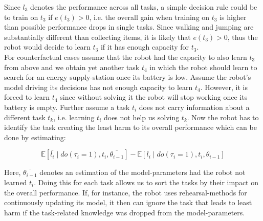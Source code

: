 \documentclass[10pt]{article}
\begin{document}
Since $l_{3}$ denotes the performance across all tasks, a simple decision rule could be to train on $t_{3}$ if $e\left(t_{3}\right)>0$, i.e. the overall gain when training on $t_{3}$ is higher than possible performance drops in single tasks. Since walking and jumping are substantially different than collecting items, it is likely that $e\left(t_{3}\right)>0$, thus the robot would decide to learn $t_{3}$ if it has enough capacity for $t_{3}$.\\
For counterfactual cases assume that the robot had the capacity to also learn $t_{3}$ from above and we obtain yet another task $t_{4}$ in which the robot should learn to search for an energy supply-station once its battery is low. Assume the robot's model driving its decisions has not enough capacity to learn $t_{4}$. However, it is forced to learn $t_{4}$ since without solving it the robot will stop working once its battery is empty. Further assume a task $t_{i}$ does not carry information about a different task $t_{k}$, i.e. learning $t_{i}$ does not help us solving $t_{k}$. Now the robot has to identify the task creating the least harm to its overall performance which can be done by estimating:

$$
\mathbb{E}\left[\overline{l_{i}} \mid d o\left(\tau_{i}=1\right), t_{i}, \overline{\theta_{i-1}}\right]-\mathbb{E}\left[l_{i} \mid d o\left(\tau_{i}=1\right), t_{i}, \theta_{i-1}\right]
$$

Here, $\overline{\theta_{i-1}}$ denotes an estimation of the model-parameters had the robot not learned $t_{i}$. Doing this for each task allows us to sort the tasks by their impact on the overall performance. If, for instance, the robot uses rehearsal-methods for continuously updating its model, it then can ignore the task that leads to least harm if the task-related knowledge was dropped from the model-parameters.
\end{document}
